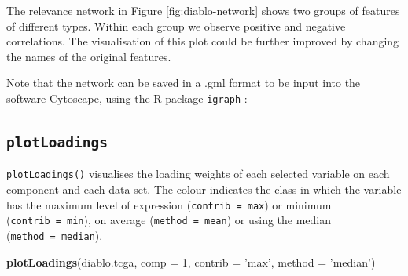 \documentclass[]{book}
\newenvironment{Shaded}{\begin{snugshade}}{\end{snugshade}}
\newcommand{\KeywordTok}[1]{\textcolor[rgb]{0.13,0.29,0.53}{\textbf{#1}}}
\newcommand{\DataTypeTok}[1]{\textcolor[rgb]{0.13,0.29,0.53}{#1}}
\newcommand{\DecValTok}[1]{\textcolor[rgb]{0.00,0.00,0.81}{#1}}
\newcommand{\FloatTok}[1]{\textcolor[rgb]{0.00,0.00,0.81}{#1}}
\newcommand{\StringTok}[1]{\textcolor[rgb]{0.31,0.60,0.02}{#1}}
\newcommand{\CommentTok}[1]{\textcolor[rgb]{0.56,0.35,0.01}{\textit{#1}}}
\newcommand{\OperatorTok}[1]{\textcolor[rgb]{0.81,0.36,0.00}{\textbf{#1}}}
\newcommand{\NormalTok}[1]{#1}
\begin{document}
The relevance network in Figure \ref{fig:diablo-network} shows two
groups of features of different types. Within each group we observe
positive and negative correlations. The visualisation of this plot could
be further improved by changing the names of the original features.

Note that the network can be saved in a .gml format to be input into the
software Cytoscape, using the R package \texttt{igraph} \citep{csa06}:

\begin{Shaded}
\end{Shaded}

\subsection{\texorpdfstring{\texttt{plotLoadings}}{plotLoadings}}\label{plotloadings}

\texttt{plotLoadings()} visualises the loading weights of each selected
variable on each component and each data set. The colour indicates the
class in which the variable has the maximum level of expression
(\texttt{contrib\ =\ \textquotesingle{}max\textquotesingle{}}) or
minimum (\texttt{contrib\ =\ \textquotesingle{}min\textquotesingle{}}),
on average
(\texttt{method\ =\ \textquotesingle{}mean\textquotesingle{}}) or using
the median
(\texttt{method\ =\ \textquotesingle{}median\textquotesingle{}}).

\begin{Shaded}
\begin{Highlighting}[]
\KeywordTok{plotLoadings}\NormalTok{(diablo.tcga, }\DataTypeTok{comp =} \DecValTok{1}\NormalTok{, }\DataTypeTok{contrib =} \StringTok{'max'}\NormalTok{, }\DataTypeTok{method =} \StringTok{'median'}\NormalTok{)}
\end{Highlighting}
\end{Shaded}
\end{document}
